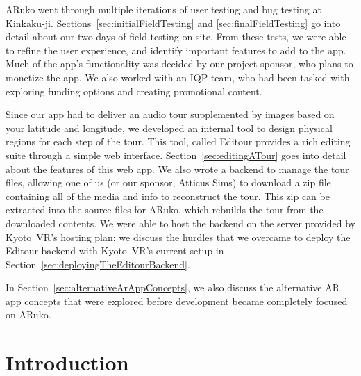\documentclass[a4paper, 10pt, american, titlepage]{article}
\begin{document}
ARuko went through multiple iterations of user testing and bug testing at
Kinkaku-ji. Sections~\ref{sec:initialFieldTesting} and
\ref{sec:finalFieldTesting} go into detail about our two days of field testing
on-site. From these tests, we were able to refine the user experience, and
identify important features to add to the app. Much of the app's functionality
was decided by our project sponsor, who plans to monetize the app. We also
worked with an IQP team, who had been tasked with exploring funding options and
creating promotional content.

Since our app had to deliver an audio tour supplemented by images based on your
latitude and longitude, we developed an internal tool to design physical
regions for each step of the tour. This tool, called Editour provides a rich
editing suite through a simple web interface. Section~\ref{sec:editingATour}
goes into detail about the features of this web app. We also wrote a backend to
manage the tour files, allowing one of us (or our sponsor, Atticus Sims) to
download a zip file containing all of the media and info to reconstruct the
tour. This zip can be extracted into the source files for ARuko, which rebuilds
the tour from the downloaded contents. We were able to host the backend on the
server provided by Kyoto~VR's hosting plan; we discuss the hurdles that we
overcame to deploy the Editour backend with Kyoto~VR's current setup in
Section~\ref{sec:deployingTheEditourBackend}.

In Section~\ref{sec:alternativeArAppConcepts}, we also discuss the alternative
AR app concepts that were explored before development became completely focused
on ARuko.

\clearpage

\begin{singlespace}
	\tableofcontents
	\clearpage

	\listoffigures
	\clearpage

	\listoftables
	\clearpage
\end{singlespace}


\section{Introduction}
\label{sec:introduction}
\end{document}
